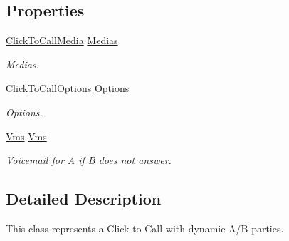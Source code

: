 \subsection*{Properties}
\begin{DoxyCompactItemize}
\item 
\hyperlink{class_thecallr_api_1_1_objects_1_1_click_to_call_1_1_click_to_call_media}{Click\+To\+Call\+Media} \hyperlink{class_thecallr_api_1_1_objects_1_1_click_to_call_1_1_click_to_call_a5397b5ba57e9f6babdbeb7471aeb5149}{Medias}
\begin{DoxyCompactList}\small\item\em Medias. \end{DoxyCompactList}\item 
\hyperlink{class_thecallr_api_1_1_objects_1_1_click_to_call_1_1_click_to_call_options}{Click\+To\+Call\+Options} \hyperlink{class_thecallr_api_1_1_objects_1_1_click_to_call_1_1_click_to_call_a870e36287a1dc95d3dd8da8da568f47e}{Options}
\begin{DoxyCompactList}\small\item\em Options. \end{DoxyCompactList}\item 
\hyperlink{class_thecallr_api_1_1_objects_1_1_app_1_1_param_1_1_vms}{Vms} \hyperlink{class_thecallr_api_1_1_objects_1_1_click_to_call_1_1_click_to_call_acd7e771b8815dfcad1bf20f9f2418e46}{Vms}
\begin{DoxyCompactList}\small\item\em Voicemail for A if B does not answer. \end{DoxyCompactList}\end{DoxyCompactItemize}


\subsection{Detailed Description}
This class represents a Click-\/to-\/\+Call with dynamic A/\+B parties. 



